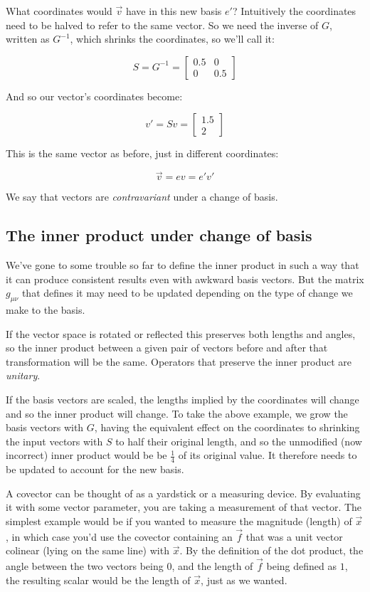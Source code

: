 What coordinates would $\vec{v}$ have in this new basis $e'$? Intuitively the coordinates need to be halved to refer to the same vector. So we need the inverse of $G$, written as $G^{-1}$, which shrinks the coordinates, so we'll call it:

$$S = G^{-1} = \begin{bmatrix}0.5 & 0 \\ 0 & 0.5\end{bmatrix}$$

And so our vector's coordinates become:

$$v' = Sv = \begin{bmatrix}1.5 \\ 2\end{bmatrix}$$

This is the same vector as before, just in different coordinates:

$$\vec{v} = ev = e'v'$$

We say that vectors are \textit{contravariant} under a change of basis.

\subsection{The inner product under change of basis}

We've gone to some trouble so far to define the inner product in such a way that it can produce consistent results even with awkward basis vectors. But the matrix $g_{\mu\nu}$ that defines it may need to be updated depending on the type of change we make to the basis.

If the vector space is rotated or reflected this preserves both lengths and angles, so the inner product between a given pair of vectors before and after that transformation will be the same. Operators that preserve the inner product are \textit{unitary}.

If the basis vectors are scaled, the lengths implied by the coordinates will change and so the inner product will change. To take the above example, we grow the basis vectors with $G$, having the equivalent effect on the coordinates to shrinking the input vectors with $S$ to half their original length, and so the unmodified (now incorrect) inner product would be be $\frac{1}{4}$ of its original value. It therefore needs to be updated to account for the new basis.

A covector can be thought of as a yardstick or a measuring device. By evaluating it with some vector parameter, you are taking a measurement of that vector. The simplest example would be if you wanted to measure the magnitude (length) of $\vec{x}$, in which case you'd use the covector containing an $\vec{f}$ that was a unit vector colinear (lying on the same line) with $\vec{x}$. By the definition of the dot product, the angle between the two vectors being $0$, and the length of $\vec{f}$ being defined as $1$, the resulting scalar would be the length of $\vec{x}$, just as we wanted.

